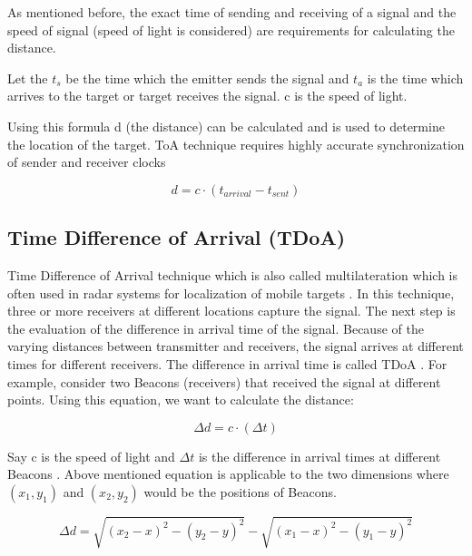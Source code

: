 As mentioned before, the exact time of sending and receiving of a signal and the speed of signal (speed of light is considered) are requirements for calculating the distance.\cite{brian17}

Let the $t_s$ be the time which the emitter sends the signal and $t_a$ is the time which arrives to the target or target receives the signal. c is the speed of light.

Using this formula d (the distance) can be calculated and is used to determine the location of the target. ToA technique requires highly accurate synchronization of sender and receiver clocks \cite{jin18}

\begin{equation}
	\label{eqn:Localization}
    d = c \cdot (t_{arrival} - t_{sent})
\end{equation}

\subsection{Time Difference of Arrival (TDoA)}
Time Difference of Arrival technique which is also called multilateration which is often used in radar systems for localization of mobile targets \cite{schaefer15}. In this technique, three or more receivers at different locations capture the signal. The next step is the evaluation of the difference in arrival time of the signal. Because of the varying distances between transmitter and receivers, the signal arrives at different times for different receivers. The difference in arrival time is called TDoA \cite{brian17}.
For example, consider two Beacons (receivers) that received the signal at different points. Using this equation, we want to calculate the distance:

\begin{equation}
	\label{eqn:distance}
    \Delta d = c \cdot (\Delta t)
\end{equation}

Say c is the speed of light and $\Delta t$ is the difference in arrival times at different Beacons \cite{schaefer18}. Above mentioned equation is applicable to the two dimensions where $(x_1,y_1)$ and $(x_2,y_2)$ would be the positions of Beacons.

\begin{equation}
    \label{eqn:distance2}
    \Delta d = \sqrt{(x_2-x)^2-(y_2-y)^2} - \sqrt{(x_1-x)^2-(y_1-y)^2}
\end{equation}


